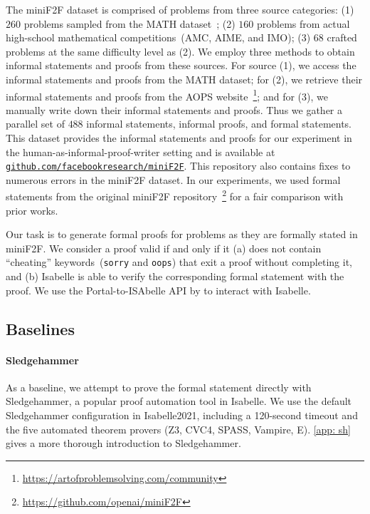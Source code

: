The miniF2F dataset is comprised of problems from three source categories: (1) $260$ problems sampled from the MATH dataset~\citep{hendrycksmath2021}; (2) $160$ problems from actual high-school mathematical competitions~(AMC, AIME, and IMO); (3) $68$ crafted problems at the same difficulty level as (2). We employ three methods to obtain informal statements and proofs from these sources. For source (1), we access the informal statements and proofs from the MATH dataset; for (2), we retrieve their informal statements and proofs from the AOPS website~\footnote{\url{https://artofproblemsolving.com/community}}; and for (3), we manually write down their informal statements and proofs. Thus we gather a parallel set of $488$ informal statements, informal proofs, and formal statements. This dataset provides the informal statements and proofs for our experiment in the human-as-informal-proof-writer setting and is available at \href{https://github.com/facebookresearch/miniF2F}{\texttt{github.com/facebookresearch/miniF2F}}. This repository also contains fixes to numerous errors in the miniF2F dataset. In our experiments, we used formal statements from the original miniF2F repository~\footnote{\url{https://github.com/openai/miniF2F}} for a fair comparison with prior works.

Our task is to generate formal proofs for problems as they are formally stated in miniF2F. We consider a proof valid if and only if it (a) does not contain ``cheating'' keywords~(\texttt{sorry} and \texttt{oops}) that exit a proof without completing it, and (b) Isabelle is able to verify the corresponding formal statement with the proof. We use the Portal-to-ISAbelle API by \citet{jiang2021language} to interact with Isabelle.

\subsection{Baselines}
\label{sec:baselines}

\paragraph{Sledgehammer} As a baseline, we attempt to prove the formal statement directly with Sledgehammer, a popular proof automation tool in Isabelle. We use the default Sledgehammer configuration in Isabelle2021, including a 120-second timeout and the five automated theorem provers (Z3, CVC4, SPASS, Vampire, E). \autoref{app: sh} gives a more thorough introduction to Sledgehammer.

